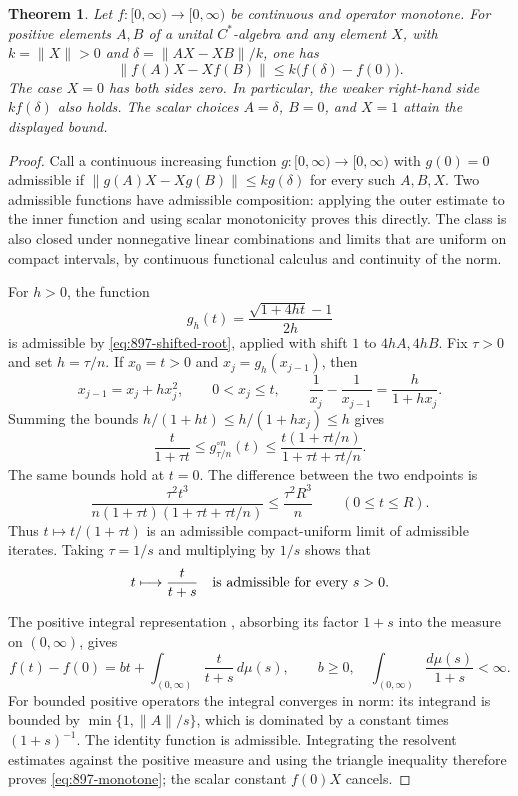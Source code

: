 \documentclass[11pt,a4paper]{article}
\newtheorem{theorem}{Theorem}[section]
\theoremstyle{remark}
\begin{document}
\begin{theorem}\label{thm:897-operator-monotone}
Let $f:[0,\infty)\to[0,\infty)$ be continuous and operator monotone.
For positive elements $A,B$ of a unital $C^*$-algebra and any element $X$,
with $k=\|X\|>0$ and $\delta=\|AX-XB\|/k$, one has
\[
 \|f(A)X-Xf(B)\|\le k\bigl(f(\delta)-f(0)\bigr).
 \tag{897.12}\label{eq:897-monotone}
\]
The case $X=0$ has both sides zero. In particular, the weaker right-hand
side $k f(\delta)$ also holds. The scalar choices $A=\delta$, $B=0$,
and $X=1$ attain the displayed bound.
\end{theorem}
\begin{proof}
Call a continuous increasing function $g:[0,\infty)\to[0,\infty)$ with
$g(0)=0$ admissible if
$\|g(A)X-Xg(B)\|\le k g(\delta)$ for every such $A,B,X$.
Two admissible functions have admissible composition: applying the
outer estimate to the inner function and using scalar monotonicity proves
this directly. The class is also closed under nonnegative linear
combinations and limits that are uniform on compact intervals, by
continuous functional calculus and continuity of the norm.

For $h>0$, the function
\[
 g_h(t)=\frac{\sqrt{1+4ht}-1}{2h}
\]
is admissible by \eqref{eq:897-shifted-root}, applied with shift $1$ to
$4hA,4hB$. Fix $\tau>0$ and set $h=\tau/n$. If
$x_0=t>0$ and $x_j=g_h(x_{j-1})$, then
\[
 x_{j-1}=x_j+hx_j^2,\qquad 0<x_j\le t,
 \qquad
 \frac1{x_j}-\frac1{x_{j-1}}=\frac{h}{1+hx_j}.
\]
Summing the bounds $h/(1+ht)\le h/(1+hx_j)\le h$ gives
\[
 \frac{t}{1+\tau t}
 \le g_{\tau/n}^{\circ n}(t)
 \le\frac{t(1+\tau t/n)}{1+\tau t+\tau t/n}.
\]
The same bounds hold at $t=0$. The difference between the two endpoints is
\[
 \frac{\tau^2t^3}
 {n(1+\tau t)(1+\tau t+\tau t/n)}
 \le\frac{\tau^2R^3}{n}\qquad(0\le t\le R).
\]
Thus $t\mapsto t/(1+\tau t)$ is an admissible compact-uniform limit of
admissible iterates. Taking $\tau=1/s$ and multiplying by $1/s$ shows that
\[
 t\longmapsto\frac{t}{t+s}
 \quad\hbox{is admissible for every }s>0.
\]

The positive integral representation
\cite[Proposition~1.1]{Chansangiam2013}, absorbing its factor $1+s$ into
the measure on $(0,\infty)$, gives
\[
 f(t)-f(0)=bt+\int_{(0,\infty)}\frac{t}{t+s}\,d\mu(s),
 \qquad b\ge0,\quad
 \int_{(0,\infty)}\frac{d\mu(s)}{1+s}<\infty.
\]
For bounded positive operators the integral converges in norm: its integrand is bounded by
$\min\{1,\|A\|/s\}$, which is dominated by a constant times $(1+s)^{-1}$.
The identity function is admissible. Integrating the resolvent estimates
against the positive measure and using the triangle inequality therefore
proves \eqref{eq:897-monotone}; the scalar constant $f(0)X$ cancels.
\end{proof}
\end{document}
